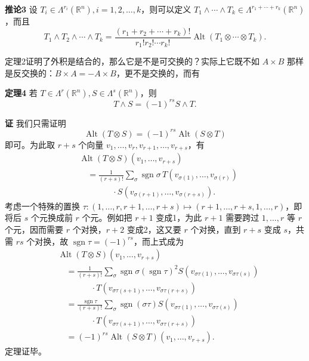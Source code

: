 \noindent\textbf{推论3}
设 $T_i\in\Lambda^{r_i}(\mathbb R^n),i=1,2,\ldots,k$，则可以定义 $T_1\wedge\cdots\wedge T_k\in\Lambda^{r_1+\cdots+r_k}(\mathbb R^n)$，而且
\begin{equation}
 T_1\wedge T_2\wedge\cdots\wedge T_k
 =\frac{(r_1+r_2+\cdots+r_k)!}{r_1!r_2!\cdots r_k!}
 \operatorname{Alt}(T_1\otimes\cdots\otimes T_k).
 \tag{24}
\end{equation}

定理2证明了外积是结合的，那么它是不是可交换的？实际上它既不如 $A\times B$ 那样是反交换的：$B\times A=-A\times B$，更不是交换的，而有

\noindent\textbf{定理4}
若 $T\in\Lambda^r(\mathbb R^n),S\in\Lambda^s(\mathbb R^n)$，则
\begin{equation}
 T\wedge S=(-1)^{rs}S\wedge T.
 \tag{25}
\end{equation}

\noindent\textbf{证}
我们只需证明
\[
 \operatorname{Alt}(T\otimes S)=(-1)^{rs}\operatorname{Alt}(S\otimes T)
\]
即可。为此取 $r+s$ 个向量 $v_1,\ldots,v_r,v_{r+1},\ldots,v_{r+s}$，有
\begin{align*}
 &\operatorname{Alt}(T\otimes S)(v_1,\ldots,v_{r+s})\\
 &\quad=\frac1{(r+s)!}\sum_\sigma\operatorname{sgn}\sigma\,
 T(v_{\sigma(1)},\ldots,v_{\sigma(r)})\\
 &\qquad\qquad\cdot S(v_{\sigma(r+1)},\ldots,v_{\sigma(r+s)}).
\end{align*}
考虑一个特殊的置换 $\tau:(1,\ldots,r,r+1,\ldots,r+s)\mapsto(r+1,\ldots,r+s,1,\ldots,r)$，即将后 $s$ 个元换成前 $r$ 个元。例如把 $r+1$ 变成1，为此 $r+1$ 需要跨过 $1,\ldots,r$ 等 $r$ 个元，因而需要 $r$ 个对换，$r+2$ 变成2，这又要 $r$ 个对换，直到 $r+s$ 变成 $s$，共需 $rs$ 个对换，故 $\operatorname{sgn}\tau=(-1)^{rs}$，而上式成为
\begin{align*}
 &\operatorname{Alt}(T\otimes S)(v_1,\ldots,v_{r+s})\\
 &\quad=\frac1{(r+s)!}\sum_\sigma\operatorname{sgn}\sigma(\operatorname{sgn}\tau)^2
 S(v_{\sigma\tau(1)},\ldots,v_{\sigma\tau(s)})\\
 &\qquad\qquad\cdot T(v_{\sigma\tau(s+1)},\ldots,v_{\sigma\tau(r+s)})\\
 &\quad=\frac{\operatorname{sgn}\tau}{(r+s)!}\sum_\sigma\operatorname{sgn}(\sigma\tau)
 S(v_{\sigma\tau(1)},\ldots,v_{\sigma\tau(s)})\\
 &\qquad\qquad\cdot T(v_{\sigma\tau(s+1)},\ldots,v_{\sigma\tau(r+s)})\\
 &\quad=(-1)^{rs}\operatorname{Alt}(S\otimes T)(v_1,\ldots,v_{r+s}).
\end{align*}
定理证毕。

